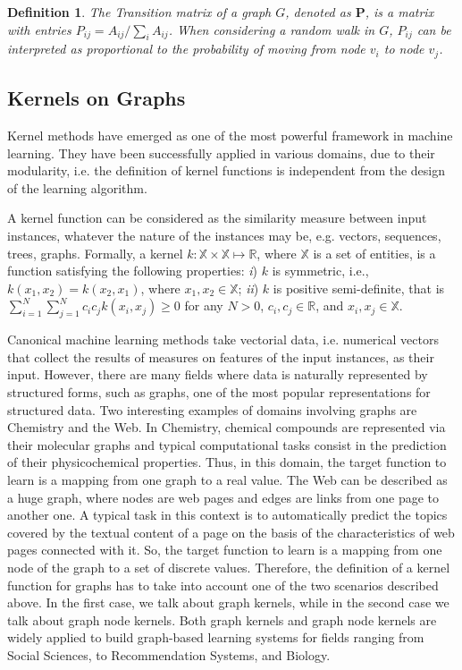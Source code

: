 \documentclass[review]{elsarticle}
\newtheorem{definition}{Definition}
\begin{document}
\begin{definition}{}
\textit{The Transition matrix of a graph $G$, denoted as $\textbf{P}$, is a matrix with entries $P_{ij} = A_{ij}/\sum_{i}^{}A_{ij}$. When considering a random walk in $G$, $P_{ij}$ can be interpreted as proportional to the probability of moving from node $v_i$ to  node $v_j$.}
\end{definition}

\subsection{Kernels on Graphs}
Kernel methods have emerged as one of the most powerful framework in machine learning. They have been successfully applied in various domains, due to their modularity, i.e. the definition of kernel functions is independent from the design of the learning algorithm. 

A kernel function can be  considered as the similarity measure between input instances, whatever the nature of the instances may be, e.g. vectors, sequences, trees, graphs.
Formally, a kernel $k: \mathbb{X} \times \mathbb{X}\longmapsto \mathbb{R}$, where $\mathbb{X}$ is a set of entities, is a function satisfying the following properties: \textit{i}) $k$ is symmetric, i.e., $k(x_1,x_2) = k(x_2,x_1)$, where $x_1, x_2 \in \mathbb{X}$; \textit{ii}) $k$ is positive semi-definite, that is $\sum_{i=1}^{N}\sum_{j=1}^{N} c_i c_jk(x_i,x_j) \geq 0$ for any $N>0$, $c_i, c_j \in \mathbb{R}$, and  $x_i, x_j \in \mathbb{X}$. 

Canonical machine learning methods take vectorial data, i.e. numerical vectors that collect the results of measures on features of the input instances, as their input. However, there are many fields where data is naturally represented by structured forms, such as graphs, one of the most popular representations for structured data. 
Two interesting examples of domains involving graphs are Chemistry and the Web. In Chemistry, chemical compounds are represented via their molecular graphs and typical computational tasks consist in the prediction of their physicochemical properties. Thus, in this domain, the target function to learn is a mapping from one graph to a real value. The Web can be described as a huge graph, where nodes are web pages and edges are links from one page to another one.  A typical task in this context is to automatically predict the topics covered by the textual content of a page on the basis of the characteristics of web pages connected with it. So, the  target function to learn is a mapping from one node of the graph to a set of discrete values.
Therefore, the definition of a kernel function for graphs has to take into account one of the two scenarios described above.
In the first case, we talk about graph kernels, while in the second case we talk about graph node kernels. Both graph kernels and graph node kernels are widely applied to build graph-based learning systems for fields ranging from Social Sciences, to Recommendation Systems, and Biology. 
\end{document}
